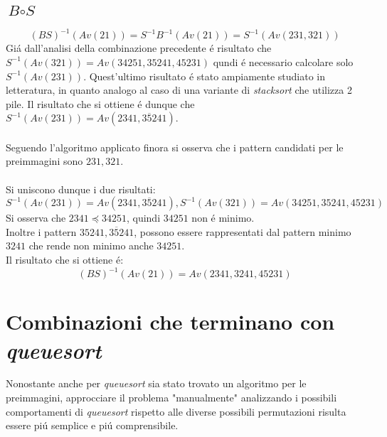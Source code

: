 \subsection*{$\textit{B}\circ\textit{S}$}$$(BS)^{-1}(Av(21))=S^{-1}B^{-1}(Av(21))=S^{-1}(Av(231,321))$$
Gi\'a dall'analisi della combinazione precedente \'e risultato che $S^{-1}(Av(321))=Av(34251, 35241, 45231)$ qundi \'e necessario calcolare solo $S^{-1}(Av(231))$. Quest'ultimo risultato \'e stato ampiamente studiato in letteratura, in quanto analogo al caso di una variante di \textit{stacksort} che utilizza 2 pile. Il risultato che si ottiene \'e dunque che $S^{-1}(Av(231))=Av(2341, 3\overline{5}241)$\cite{claesson2012sorting}.\\\\
Seguendo l'algoritmo applicato finora si osserva che i pattern candidati per le preimmagini sono $231,321$.\\\\
Si uniscono dunque i due risultati:
$$S^{-1}(Av(231))=Av(2341,3\overline{5}241), S^{-1}(Av(321))=Av(34251, 35241, 45231)$$
Si osserva che $2341\preceq 34251$, quindi $34251$ non \'e minimo.\\
Inoltre i pattern $35241, 3\overline{5}241$, possono essere rappresentati dal pattern minimo $3241$ che rende non minimo anche $34251$.\\Il risultato che si ottiene \'e:$$(BS)^{-1}(Av(21))=Av(2341,3241,45231)$$
\section*{Combinazioni che terminano con \textit{queuesort}}
Nonostante anche per \textit{queuesort} sia stato trovato un algoritmo per le preimmagini\cite{magnusson2013sorting}, approcciare il problema "manualmente" analizzando i possibili comportamenti di \textit{queuesort} rispetto alle diverse possibili permutazioni risulta essere pi\'u semplice e pi\'u comprensibile.
